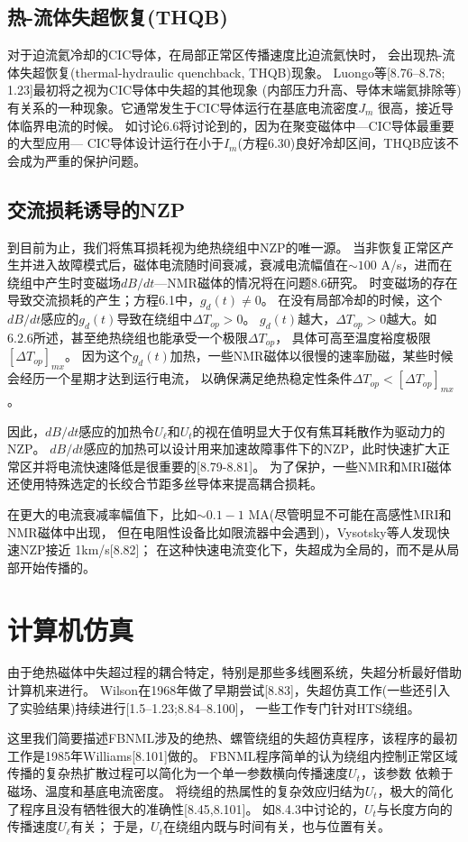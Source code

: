 \subsection{热-流体失超恢复(THQB)}
对于迫流氦冷却的CIC导体，在局部正常区传播速度比迫流氦快时，
会出现热-流体失超恢复(thermal-hydraulic quenchback, THQB)现象。
Luongo等[8.76–8.78; 1.23]最初将之视为CIC导体中失超的其他现象
(内部压力升高、导体末端氦排除等)有关系的一种现象。它通常发生于CIC导体运行在基底电流密度$J_m$
很高，接近导体临界电流的时候。
如讨论6.6将讨论到的，因为在聚变磁体中---CIC导体最重要的大型应用---
CIC导体设计运行在小于$I_m$(方程6.30)良好冷却区间，THQB应该不会成为严重的保护问题。

\subsection{交流损耗诱导的NZP}
到目前为止，我们将焦耳损耗视为绝热绕组中NZP的唯一源。
当非恢复正常区产生并进入故障模式后，磁体电流随时间衰减，衰减电流幅值在$\sim 100$ A/s，进而在绕组中产生时变磁场$dB/dt$---NMR磁体的情况将在问题8.6研究。
时变磁场的存在导致交流损耗的产生；方程6.1中，$g_d(t)\neq 0$。
在没有局部冷却的时候，这个$dB/dt$感应的$g_d(t)$导致在绕组中$\Delta T_{op}>0$。
$g_d(t)$越大，$\Delta T_{op}>0$越大。如6.2.6所述，甚至绝热绕组也能承受一个极限$\Delta T_{op}$，
具体可高至温度裕度极限$[\Delta T_{op}]_{mx}$。
因为这个$g_d(t)$加热，一些NMR磁体以很慢的速率励磁，某些时候会经历一个星期才达到运行电流，
以确保满足绝热稳定性条件$\Delta T_{op}<[\Delta T_{op}]_{mx}$。

因此，$dB/dt$感应的加热令$U_\ell$和$U_t$的视在值明显大于仅有焦耳耗散作为驱动力的NZP。
$dB/dt$感应的加热可以设计用来加速故障事件下的NZP，此时快速扩大正常区并将电流快速降低是很重要的[8.79-8.81]。
为了保护，一些NMR和MRI磁体还使用特殊选定的长绞合节距多丝导体来提高耦合损耗。

在更大的电流衰减率幅值下，比如$\sim 0.1-1$ MA(尽管明显不可能在高感性MRI和NMR磁体中出现，
但在电阻性设备比如限流器中会遇到)，Vysotsky等人发现快速NZP接近 1km/s[8.82]；
在这种快速电流变化下，失超成为全局的，而不是从局部开始传播的。


\section{计算机仿真}
由于绝热磁体中失超过程的耦合特定，特别是那些多线圈系统，失超分析最好借助计算机来进行。
Wilson在1968年做了早期尝试[8.83]，失超仿真工作(一些还引入了实验结果)持续进行[1.5–1.23;8.84–8.100]，
一些工作专门针对HTS绕组。

这里我们简要描述FBNML涉及的绝热、螺管绕组的失超仿真程序，该程序的最初工作是1985年Williams[8.101]做的。
FBNML程序简单的认为绕组内控制正常区域传播的复杂热扩散过程可以简化为一个单一参数横向传播速度$U_t$，该参数
依赖于磁场、温度和基底电流密度。
将绕组的热属性的复杂效应归结为$U_t$，极大的简化了程序且没有牺牲很大的准确性[8.45,8.101]。
如8.4.3中讨论的，$U_t$与长度方向的传播速度$U_\ell$有关；
于是，$U_t$在绕组内既与时间有关，也与位置有关。


